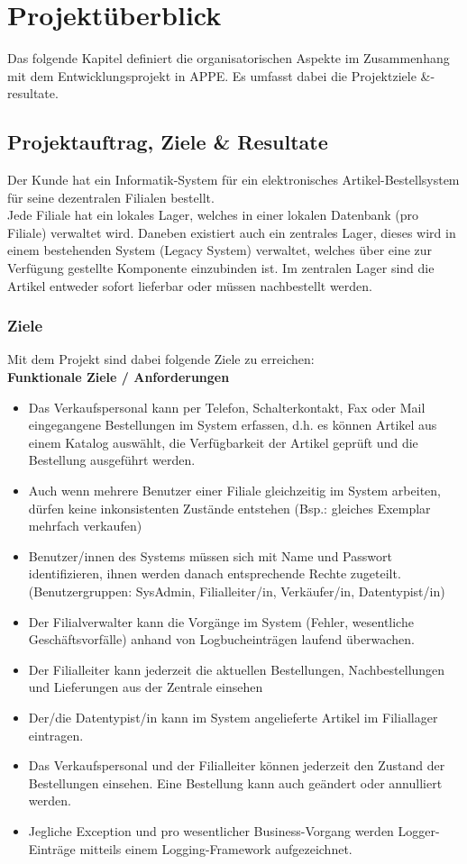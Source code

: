 \section{Projektüberblick}
Das folgende Kapitel definiert die organisatorischen Aspekte im Zusammenhang mit dem Entwicklungsprojekt in APPE. Es umfasst dabei die Projektziele \&-resultate.
\subsection{Projektauftrag, Ziele \& Resultate}
Der Kunde hat ein Informatik-System für ein elektronisches Artikel-Bestellsystem für seine dezentralen Filialen bestellt.\\
Jede Filiale hat ein lokales Lager, welches in einer lokalen Datenbank (pro Filiale) verwaltet wird. Daneben existiert auch ein zentrales Lager, dieses wird in einem bestehenden System (Legacy System) verwaltet, welches über eine zur Verfügung gestellte Komponente einzubinden ist. Im zentralen Lager sind die Artikel entweder sofort lieferbar oder müssen nachbestellt werden.
\subsubsection{Ziele}
Mit dem Projekt sind dabei folgende Ziele zu erreichen:\\
\textbf{Funktionale Ziele / Anforderungen}
\begin{itemize}
\item Das Verkaufspersonal kann per Telefon, Schalterkontakt, Fax oder Mail eingegangene Bestellungen im System erfassen, d.h. es können Artikel aus einem Katalog auswählt, die Verfügbarkeit der Artikel geprüft und die Bestellung ausgeführt werden.
\item Auch wenn mehrere Benutzer einer Filiale gleichzeitig im System arbeiten, dürfen keine inkonsistenten Zustände entstehen (Bsp.: gleiches Exemplar mehrfach verkaufen)
\item Benutzer/innen des Systems müssen sich mit Name und Passwort identifizieren, ihnen werden danach entsprechende Rechte zugeteilt. (Benutzergruppen: SysAdmin, Filialleiter/in, Verkäufer/in, Datentypist/in)
\item Der Filialverwalter kann die Vorgänge im System (Fehler, wesentliche Geschäftsvorfälle) anhand von Logbucheinträgen laufend überwachen.
\item Der Filialleiter kann jederzeit die aktuellen Bestellungen, Nachbestellungen und Lieferungen aus der Zentrale einsehen
\item Der/die Datentypist/in kann im System angelieferte Artikel im Filiallager eintragen.
\item Das Verkaufspersonal und der Filialleiter können jederzeit den Zustand der Bestellungen einsehen. Eine Bestellung kann auch geändert oder annulliert werden.
\item Jegliche Exception und pro wesentlicher Business-Vorgang werden Logger-Einträge mitteils einem Logging-Framework aufgezeichnet.
\end{itemize}

